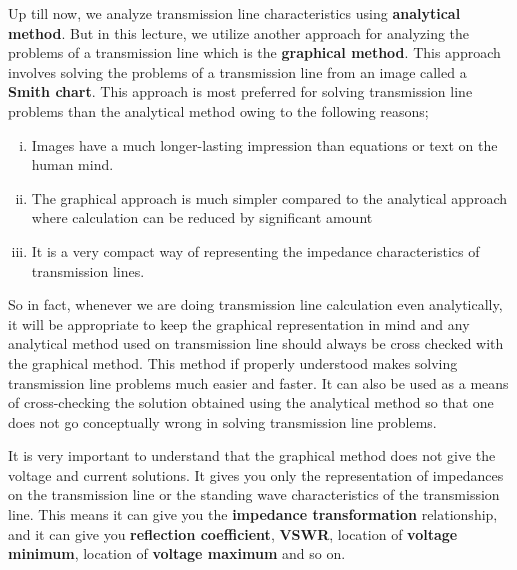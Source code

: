 Up till now, we analyze transmission line characteristics using \textbf{analytical method}. But in this lecture, we utilize another approach for analyzing the problems of a transmission line which is the \textbf{graphical method}. This approach involves solving the problems of a transmission line from an image called a \textbf{Smith chart}. This approach is most preferred for solving transmission line problems than the analytical method owing to the following reasons;
\begin{enumerate}[(i)]
\item Images have a much longer-lasting impression than equations or text on the human mind.
\item The graphical approach is much simpler compared to the analytical approach where calculation can be reduced by significant amount
\item It is a very compact way of representing the impedance characteristics of transmission lines.
\end{enumerate}
So in fact, whenever we are doing transmission line calculation even analytically, it will be appropriate to keep the graphical representation in mind and any analytical method used on transmission line should always be cross checked with the graphical method.
This method if properly understood makes solving transmission line problems much easier and faster. It can also be used as a means of cross-checking the solution obtained using the analytical method so that one does not go conceptually wrong in solving transmission line problems.

It is very important to understand that the graphical method does not give the voltage and current solutions. It gives you only the representation of impedances on the transmission line or the standing wave characteristics of the transmission line. This means it can give you the \textbf{impedance transformation} relationship, and it can give you \textbf{reflection coefficient}, \textbf{VSWR}, location of \textbf{voltage minimum}, location of \textbf{voltage maximum} and so on.
